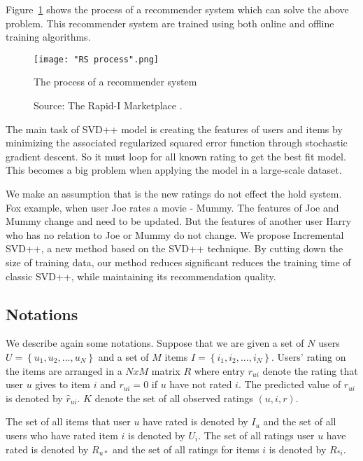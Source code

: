 \documentclass[oneside,13pt]{extreport}
\begin{document}
Figure~\ref{fig:RS_process} shows the process of a recommender system which can solve the above problem. This recommender system are trained using both online and offline training algorithms.
\clearpage
\begin{figure}[h!]
    \centering
    \texttt{[image: "RS process".png]} 
    \caption{The process of a recommender system}
    \!\!\!\!
    \caption*{Source: The Rapid-I Marketplace .}
    \label{fig:RS_process}
\end{figure}


The main task of SVD++ model is creating the features of users and items by minimizing the associated regularized squared error function through stochastic gradient descent. So it must loop for all known rating to get the best fit model. This becomes a big problem when applying the model in a large-scale dataset.
 
We make an assumption that is the new ratings do not effect the hold system. Fox example, when user Joe rates  a movie - Mummy. The features of Joe and Mummy change and need to be updated. But the features of another user Harry who has no relation to Joe or Mummy do not change. We propose Incremental SVD++, a new method based on the SVD++ technique. By cutting down the size of training data, our method reduces significant reduces the training time of classic SVD++, while maintaining its recommendation quality. 

\subsection{Notations}
We describe again some notations. Suppose that we are given
a set of $N$ users $U = \left\{ {{u_1},{u_2},...,{u_N}} \right\}$ and a set of $M$ items $I = \left\{ {{i_1},{i_2},...,{i_N}} \right\}$. Users’ rating on the items are arranged in a $NxM$ matrix $R$ where entry $r_{ui}$ denote the rating that user $u$ gives to item $i$ and $r_{ui} = 0$ if $u$ have not rated $i$. The predicted value of $r_{ui}$ is denoted by $\hat r_{ui}$. $K$ denote the set of all observed
ratings $\left( {u,i,r} \right)$. 

The set of all items that user $u$ have rated is denoted by $I_u$ and the set of all users who have rated item $i$ is denoted by $U_i$.
The set of all ratings user $u$ have rated is denoted by $R_{u*}$ and the set of all ratings for items $i$ is denoted by $R_{*i}$.
\end{document}
